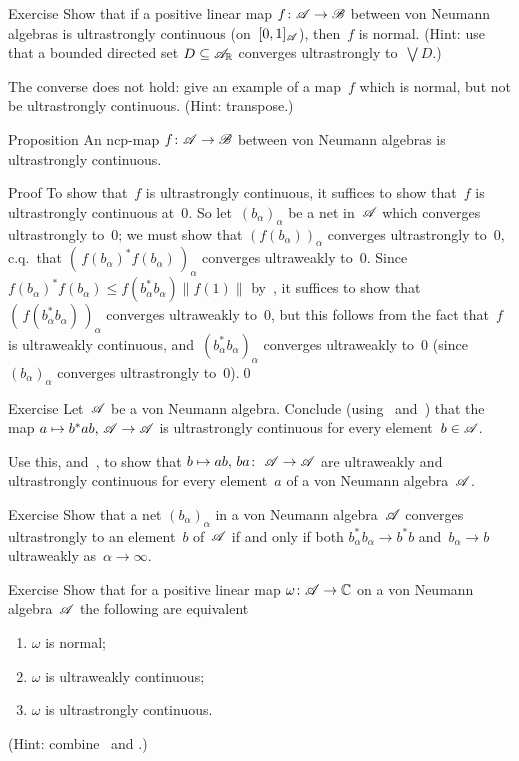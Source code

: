 \documentclass[a]{subfiles}
\begin{document}
\begin{parsec}%
\begin{point}{Exercise}%
Show that if a positive linear map $f\colon \mathscr{A}\to\mathscr{B}$
between von Neumann algebras 
is ultrastrongly continuous (on~$[0,1]_{\mathscr{A}}$), 
then~$f$ is normal.
(Hint: use that a bounded directed set 
$D\subseteq \mathscr{A}_{\mathbb{R}}$ converges ultrastrongly to~$\bigvee D$.)

The converse does not hold: give an example of a map~$f$ 
which is normal, but 
not be ultrastrongly continuous. (Hint: transpose.)
\end{point}
\begin{point}[cp-uscont]{Proposition}%
An ncp-map $f\colon \mathscr{A}\to\mathscr{B}$
between von Neumann algebras is 
ultrastrongly continuous.
\begin{point}{Proof}%
To show that~$f$
is ultrastrongly continuous,
it suffices to show that~$f$ is ultrastrongly continuous at~$0$.
So let~$(b_\alpha)_\alpha$ be a net in~$\mathscr{A}$
which converges ultrastrongly to~$0$;
we must show that $(f(b_\alpha))_\alpha$
converges ultrastrongly to~$0$, c.q.~that
$(\,f(b_\alpha)^*f(b_\alpha)\,)_\alpha$ converges ultraweakly to~$0$.
Since
$f(b_\alpha)^*f(b_\alpha) \leq f(b_\alpha^*b_\alpha) \|f(1)\|$
by~, 
it suffices to show that~$(\,f(b_\alpha^*b_\alpha)\,)_\alpha$
converges ultraweakly to~$0$,
but this follows from the
fact that~$f$ is ultraweakly continuous,
and~$(b_\alpha^*b_\alpha)_\alpha$
converges ultraweakly to~$0$
(since~$(b_\alpha)_\alpha$ converges ultrastrongly to~$0$).\qed
\end{point}
\end{point}
\begin{point}{Exercise}%
Let~$\mathscr{A}$ be a von Neumann algebra.
Conclude (using~ and~)
that the map $a\mapsto b^*ab,\,\mathscr{A}\to\mathscr{A}$
is ultrastrongly continuous for every
 element~$b\in\mathscr{A}$.

Use this,
and~,
to
show that $b\mapsto ab,\,ba\colon\ \mathscr{A}\to\mathscr{A}$
are ultraweakly and ultrastrongly continuous
for every element~$a$ of a von Neumann algebra~$\mathscr{A}$.
\end{point}
\begin{point}[usconv]{Exercise}%
Show that a net $(b_\alpha)_\alpha$ 
in a von Neumann algebra~$\mathscr{A}$
converges ultrastrongly to an element~$b$
of~$\mathscr{A}$
if and only if
both $b_\alpha^*b_\alpha\longrightarrow b^*b$
and~$b_\alpha\longrightarrow b$
ultraweakly as~$\alpha\to\infty$.
\end{point}
\begin{point}[npuws]{Exercise}%
Show that for a positive linear map $\omega \colon \mathscr{A}\to\mathbb{C}$
on a von Neumann algebra~$\mathscr{A}$
the following are equivalent
\begin{enumerate}
\item
	$\omega$ is normal;
\item
	$\omega$ is ultraweakly continuous;
\item
	$\omega$ is ultrastrongly continuous.
\end{enumerate}
(Hint: combine~ and .)
\end{point}
\end{parsec}
\end{document}
